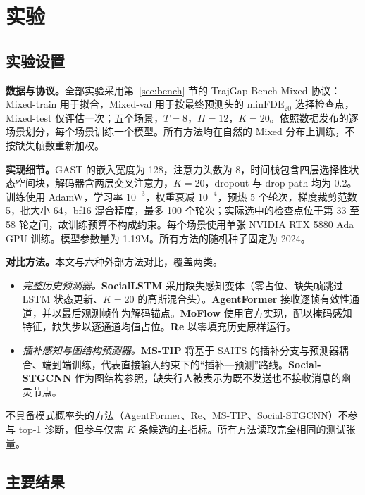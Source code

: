 \section{实验}
\label{sec:exp}

\subsection{实验设置}
\label{sec:setup}

\textbf{数据与协议。}全部实验采用第~\ref{sec:bench} 节的 TrajGap-Bench Mixed 协议：Mixed-train 用于拟合，Mixed-val 用于按最终预测头的 $\mathrm{minFDE}_{20}$ 选择检查点，Mixed-test 仅评估一次；五个场景，$T=8$，$H=12$，$K=20$。依照数据发布的逐场景划分，每个场景训练一个模型。所有方法均在自然的 Mixed 分布上训练，不按缺失帧数重新加权。

\textbf{实现细节。}GAST 的嵌入宽度为 128，注意力头数为 8，时间栈包含四层选择性状态空间块，解码器含两层交叉注意力，$K=20$，dropout 与 drop-path 均为 0.2。训练使用 AdamW，学习率 $10^{-3}$，权重衰减 $10^{-4}$，预热 5 个轮次，梯度裁剪范数 5，批大小 64，bf16 混合精度，最多 100 个轮次；实际选中的检查点位于第 33 至 58 轮之间，故训练预算不构成约束。每个场景使用单张 NVIDIA RTX 5880 Ada GPU 训练。模型参数量为 1.19M。所有方法的随机种子固定为 2024。

\textbf{对比方法。}本文与六种外部方法对比，覆盖两类。
\begin{itemize}
\item \emph{完整历史预测器。}\textbf{SocialLSTM} \cite{alahi2016social} 采用缺失感知变体（零占位、缺失帧跳过 LSTM 状态更新、$K=20$ 的高斯混合头）。\textbf{AgentFormer} \cite{yuan2021agentformer} 接收逐帧有效性通道，并以最后观测帧作为解码锚点。\textbf{MoFlow} \cite{fu2025moflow} 使用官方实现，配以掩码感知特征，缺失步以逐通道均值占位。\textbf{Re} \cite{mao2025resonance} 以零填充历史原样运行。
\item \emph{插补感知与图结构预测器。}\textbf{MS-TIP} \cite{chib2024mstip} 将基于 SAITS 的插补分支与预测器耦合、端到端训练，代表直接输入约束下的“插补—预测”路线。\textbf{Social-STGCNN} \cite{mohamed2020social} 作为图结构参照，缺失行人被表示为既不发送也不接收消息的幽灵节点。
\end{itemize}
不具备模式概率头的方法（AgentFormer、Re、MS-TIP、Social-STGCNN）不参与 top-1 诊断，但参与仅需 $K$ 条候选的主指标。所有方法读取完全相同的测试张量。

\subsection{主要结果}
\label{sec:main}

